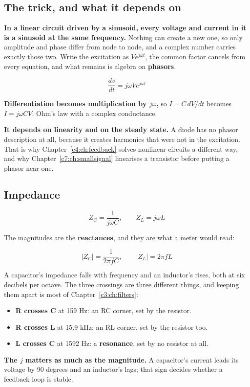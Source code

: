 \subsection{The trick, and what it depends on}
\label{c2:sec:a3}
\textbf{In a linear circuit driven by a sinusoid, every voltage and current in it is a sinusoid at the same frequency.} Nothing can create a new one, so only amplitude and phase differ from node to node, and a complex number carries exactly those two. Write the excitation as $V e^{j\omega t}$, the common factor cancels from every equation, and what remains is algebra on \textbf{phasors}.

\[
  \frac{dv}{dt} = j\omega V e^{j\omega t}
\]

\textbf{Differentiation becomes multiplication by $j\omega$,} so $I = C\,dV/dt$ becomes $I = j\omega C V$: Ohm's law with a complex conductance.

\textbf{It depends on linearity and on the steady state.} A diode has no phasor description at all, because it creates harmonics that were not in the excitation. That is why Chapter~\ref{c4:ch:feedback} solves nonlinear circuits a different way, and why Chapter~\ref{c7:ch:smallsignal} linearises a transistor before putting a phasor near one.

\subsection{Impedance}
\label{c2:sec:a4}
\[
  Z_C = \frac{1}{j\omega C}, \qquad Z_L = j\omega L
\]

The magnitudes are the \textbf{reactances}, and they are what a meter would read:

\[
  |Z_C| = \frac{1}{2\pi f C}, \qquad |Z_L| = 2\pi f L
\]


A capacitor's impedance falls with frequency and an inductor's rises, both at six decibels per octave. The three crossings are three different things, and keeping them apart is most of Chapter~\ref{c3:ch:filters}:

\begin{itemize}
  \item \textbf{R crosses C} at 159 Hz: an RC corner, set by the resistor.
  \item \textbf{R crosses L} at 15.9 kHz: an RL corner, set by the resistor too.
  \item \textbf{L crosses C} at 1592 Hz: a \textbf{resonance}, set by no resistor at all.
\end{itemize}
\textbf{The $j$ matters as much as the magnitude.} A capacitor's current leads its voltage by 90 degrees and an inductor's lags; that sign decides whether a feedback loop is stable.

